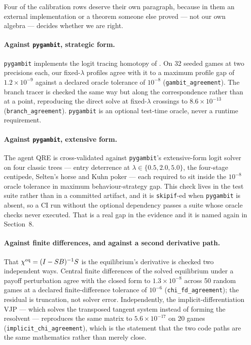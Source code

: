 Four of the calibration rows deserve their own paragraph, because in them an
external implementation or a theorem someone else proved --- not our own algebra
--- decides whether we are right.

\paragraph{Against \texttt{pygambit}, strategic form.} \texttt{pygambit}
\citep{gambit} implements the logit tracing homotopy of \citet{turocy2005}. On 32
seeded games at two precisions each, our fixed-$\lambda$ profiles agree with it
to a maximum profile gap of $1.2\times10^{-9}$ against a declared oracle
tolerance of $10^{-8}$ (\texttt{gambit\_agreement}). The branch tracer is checked
the same way but along the correspondence rather than at a point, reproducing the
direct solve at fixed-$\lambda$ crossings to $8.6\times10^{-13}$
(\texttt{branch\_agreement}). \texttt{pygambit} is an optional test-time oracle,
never a runtime requirement.

\paragraph{Against \texttt{pygambit}, extensive form.} The agent QRE is
cross-validated against \texttt{pygambit}'s extensive-form logit solver on four
classic trees --- entry deterrence at $\lambda\in\{0.5,2.0,5.0\}$, the four-stage
centipede, Selten's horse and Kuhn poker --- each required to sit inside the
$10^{-8}$ oracle tolerance in maximum behaviour-strategy gap. This check lives in
the test suite rather than in a committed artifact, and it is \texttt{skipif}-ed
when \texttt{pygambit} is absent, so a CI run without the optional dependency
passes a suite whose oracle checks never executed. That is a real gap in the
evidence and it is named again in Section~8.

\paragraph{Against finite differences, and against a second derivative path.}
That $\chi^{\mathrm{eq}}=(I-SB)^{-1}S$ is the equilibrium's derivative is checked two
independent ways. Central finite differences of the solved equilibrium under a
payoff perturbation agree with the closed form to $1.3\times10^{-8}$ across 50
random games at a declared finite-difference tolerance of $10^{-6}$
(\texttt{chi\_fd\_agreement}); the residual is truncation, not solver error.
Independently, the implicit-differentiation VJP --- which solves the transposed
tangent system instead of forming the resolvent --- reproduces the same matrix to
$5.6\times10^{-17}$ on 20 games (\texttt{implicit\_chi\_agreement}), which is the
statement that the two code paths are the same mathematics rather than merely
close.

